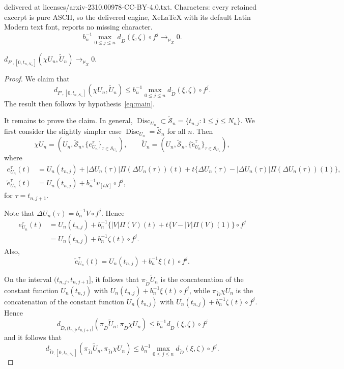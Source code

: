 \documentclass[10pt,a4paper]{amsart}
\newcommand{\cS}{{\mathcal S}}
\newcommand{\disc}{\operatorname{Disc}}
\newcommand{\tD}{{\widetilde D}}
\newcommand{\tU}{{\widetilde U}}
\newcommand{\tcS}{{\widetilde{\mathcal S}}}
\newcommand{\te}{{\tilde e}}
\begin{document}
delivered at licenses/arxiv-2310.00978-CC-BY-4.0.txt. Characters: every retained excerpt is pure ASCII, so the delivered engine, XeLaTeX with its default Latin Modern text font, reports no missing character.
	\begin{equation} \label{eq:main}
	b_n^{-1}\max_{0\le j\le n} d_\tD(\xi,\zeta)\circ f^j \to_{\mu_X} 0.
	\end{equation} 

\begin{prop}  \label{prop:comp2}
$d_{F',[0,t_{n,N_n}]}(\chi U_n, \tU_n)\to_{\mu_X}0$.
\end{prop}

\begin{proof}
We claim that
\[
d_{F',[0,t_{n,N_n}]}(\chi U_n,\tU_n)
\le b_n^{-1}\max_{0\le j\le n}d_\tD(\xi,\zeta)\circ f^j.
\]
The result then follows by hypothesis~\eqref{eq:main}.

It remains to prove the claim.
In general, $\disc_{U_n}\subset\tcS_n=\{t_{n,j}:1\le j\le N_n\}$.
We first consider the slightly simpler case 
$\disc_{U_n}=\tcS_n$ for all $n$. Then
\[
\chi U_n=(U_n,\tcS_n,\{e_{U_n}^\tau\}_{\tau\in \cS_{U_n}}), \qquad
\tU_n=(U_n,\tcS_n,\{\te_{U_n}^\tau\}_{\tau\in \cS_{U_n}}),
\]
where 
\begin{align*}
e_{U_n}^\tau(t) & = U_n(t_{n,j})+ |\Delta U_n(\tau)| \Pi(\Delta U_n(\tau))(t)  + t\big\{\Delta U_n(\tau) -|\Delta U_n(\tau)|\Pi(\Delta U_n(\tau))(1) \big\},
\\
\te_{U_n}^\tau(t) & =U_n(t_{n,j})+b_n^{-1}v_{[tR]}\circ f^j,
\end{align*}
for $\tau=t_{n,j+1}$.

Note that $\Delta U_n(\tau)= b_n^{-1}V\circ f^j$.
Hence
\begin{align*}
e_{U_n}^\tau(t) & 
=U_n(t_{n,j})+b_n^{-1}\big\{
|V| \Pi(V)(t)  + t\big\{V-|V|\Pi(V)(1)
\big\} \circ f^j
\\ & =U_n(t_{n,j})+b_n^{-1} \zeta(t)\circ f^j.
\end{align*}
Also,
\[
\te_{U_n}^\tau(t)  =U_n(t_{n,j})+b_n^{-1}\xi(t)\circ f^j.
\]

On the interval $(t_{n,j},t_{n,j+1}]$, it follows that
$\pi_\tD \tU_n$ is the concatenation of the constant function $U_n(t_{n,j})$ with $U_n(t_{n,j})+b_n^{-1} \xi(t) \circ f^j$, while
$\pi_\tD \chi U_n$ is the concatenation of the constant function $U_n(t_{n,j})$ with $U_n(t_{n,j})+b_n^{-1}\zeta(t)\circ f^j$. 
Hence 
\[
d_{\tD,(t_{n,j},t_{n,j+1}]}(\pi_\tD \tU_n,\pi_\tD \chi U_n)
\le b_n^{-1}d_\tD(\xi,\zeta)\circ f^j
\]
and it follows that
\[
d_{\tD,[0,t_{n,N_n}]}(\pi_\tD \tU_n,\pi_\tD \chi U_n)
\le b_n^{-1}\max_{0\le j\le n}d_\tD(\xi,\zeta)\circ f^j.
\]


\end{proof}
\end{document}
